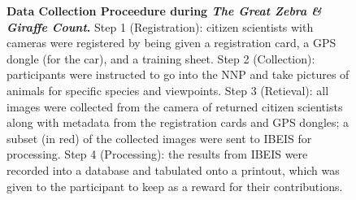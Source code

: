 

\begin{figure}[t]%
    \centering
    \caption[Data Collection Proceedure during \textit{The Great Zebra \& Giraffe Count}]{\textbf{Data Collection Proceedure during \textit{The Great Zebra \& Giraffe Count}.}  Step 1 (Registration): citizen scientists with cameras were registered by being given a registration card, a GPS dongle (for the car), and a training sheet.  Step 2 (Collection): participants were instructed to go into the NNP and take pictures of animals for specific species and viewpoints.  Step 3 (Retieval): all images were collected from the camera of returned citizen scientists along with metadata from the registration cards and GPS dongles; a subset (in red) of the collected images were sent to IBEIS for processing.  Step 4 (Processing): the results from IBEIS were recorded into a database and tabulated onto a printout, which was given to the participant to keep as a reward for their contributions.}
        \label{fig:process}
\end{figure}

